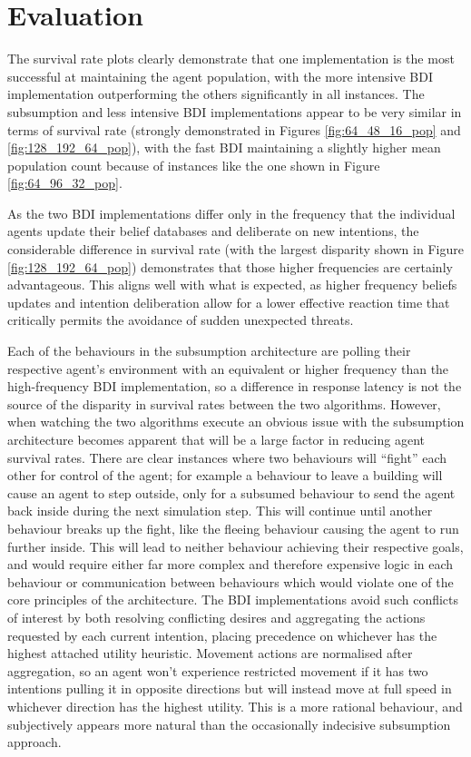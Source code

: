 \documentclass[a4paper,12pt]{article}
\begin{document}
\newpage
\section{Evaluation}
\noindent
The survival rate plots clearly demonstrate that one implementation is the most successful at maintaining the agent population, with the more intensive BDI implementation outperforming the others significantly in all instances. The subsumption and less intensive BDI implementations appear to be very similar in terms of survival rate (strongly demonstrated in Figures \ref{fig:64_48_16_pop} and \ref{fig:128_192_64_pop}), with the fast BDI maintaining a slightly higher mean population count because of instances like the one shown in Figure \ref{fig:64_96_32_pop}.

As the two BDI implementations differ only in the frequency that the individual agents update their belief databases and deliberate on new intentions, the considerable difference in survival rate (with the largest disparity shown in Figure \ref{fig:128_192_64_pop}) demonstrates that those higher frequencies are certainly advantageous. This aligns well with what is expected, as higher frequency beliefs updates and intention deliberation allow for a lower effective reaction time that critically permits the avoidance of sudden unexpected threats.

Each of the behaviours in the subsumption architecture are polling their respective agent's environment with an equivalent or higher frequency than the high-frequency BDI implementation, so a difference in response latency is not the source of the disparity in survival rates between the two algorithms. However, when watching the two algorithms execute an obvious issue with the subsumption architecture becomes apparent that will be a large factor in reducing agent survival rates. There are clear instances where two behaviours will ``fight'' each other for control of the agent; for example a behaviour to leave a building will cause an agent to step outside, only for a subsumed behaviour to send the agent back inside during the next simulation step. This will continue until another behaviour breaks up the fight, like the fleeing behaviour causing the agent to run further inside. This will lead to neither behaviour achieving their respective goals, and would require either far more complex and therefore expensive logic in each behaviour or communication between behaviours which would violate one of the core principles of the architecture. The BDI implementations avoid such conflicts of interest by both resolving conflicting desires and aggregating the actions requested by each current intention, placing precedence on whichever has the highest attached utility heuristic. Movement actions are normalised after aggregation, so an agent won't experience restricted movement if it has two intentions pulling it in opposite directions but will instead move at full speed in whichever direction has the highest utility. This is a more rational behaviour, and subjectively appears more natural than the occasionally indecisive subsumption approach.
\end{document}
